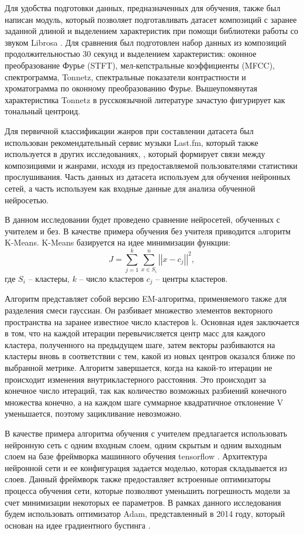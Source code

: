 Для удобства подготовки данных, предназначенных для обучения, также был написан модуль, который позволяет подготавливать датасет композиций
с заранее заданной длиной и выделением характеристик при помощи библиотеки работы со звуком Librosa \cite{librosa}. Для сравнения был подготовлен набор данных из
композиций продолжительностью 30 секунд и выделением характеристик: оконное преобразование Фурье (STFT), мел-кепстральные коэффициенты (MFCC), спектрограмма, Tonnetz, спектральные показатели контрастности и хроматограмма по оконному преобразованию Фурье.  Вышеупомянутая характеристика Tonnetz в русскоязычной литературе зачастую фигурирует как тональный центроид.

Для первичной классификации жанров при составлении датасета был использован рекомендательный сервис музыки Last.fm, который также используется в других исследованиях, \cite{lastfm}, который
формирует связи между композициями и жанрами, исходя из предоставляемой пользователями статистики прослушивания.
Часть данных из датасета используем для обучения нейронных сетей, 
а часть используем как входные данные для анализа обученной нейросетью. 

В данном исследовании будет проведено сравнение
нейросетей, обученных с учителем и без. В качестве примера обучения без учителя приводится aлгоритм K-Means.
K-Means базируется на идее минимизации функции:
\begin{equation}
	J = \sum_{j=1}^k \sum_{x \in S_i}^n \left|\left| x - c_j\right|\right|^2,
\end{equation}
где $S_i$ -- кластеры, $k$ -- число кластеров $c_j$ -- центры кластеров.

Алгоритм представляет собой версию EM-алгоритма, применяемого также для разделения смеси гауссиан. Он разбивает множество элементов векторного пространства на заранее известное число кластеров k.
Основная идея заключается в том, что на каждой итерации перевычисляется центр масс для каждого кластера, полученного на предыдущем шаге, затем векторы разбиваются на кластеры вновь в соответствии с тем, какой из новых центров оказался ближе по выбранной метрике.
Алгоритм завершается, когда на какой-то итерации не происходит изменения внутрикластерного расстояния. Это происходит за конечное число итераций, так как количество возможных разбиений конечного множества конечно, а на каждом шаге суммарное квадратичное отклонение V уменьшается, поэтому зацикливание невозможно.

В качестве примера алгоритма обучения с учителем предлагается использовать нейронную сеть с одним входным слоем, одним скрытым и одним выходным слоем на базе фреймворка машинного обучения tensorflow \cite{tensorflow}.
Архитектура нейронной сети и ее конфигурация задается моделью, которая складывается из слоев. 
Данный фреймворк также предоставляет встроенные оптимизаторы процесса обучения сети, которые позволяют уменьшить погрешность модели за счет минимизации некоторых ее параметров. В рамках данного исследования будем использовать оптимизатор Adam, представленный в 2014 году, который основан на идее градиентного бустинга \cite{adam}.

